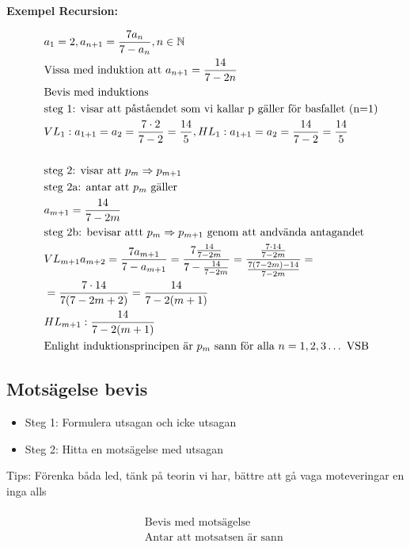 \textbf{Exempel Recursion:}\par
\begin{align*}
  &\quad  a_1 = 2, a_{n+1} = \frac{7a_n}{7-a_n}, n \in \mathbb{N} \\
  &\quad  \text{Vissa med induktion att } a_{n+1} = \frac{14}{7-2n} \\ 
  &\quad  \text{Bevis med induktions} \\
  &\quad  \text{steg 1: visar att påståendet som vi kallar p gäller för basfallet (n=1)} \\
  &\quad  VL_1: a_{1+1}=a_2=\frac{7 \cdot 2}{7-2}=\frac{14}{5}, HL_1: a_{1+1}=a_2=\frac{14}{7-2}=\frac{14}{5} \\
  &\quad  \\
  &\quad  \text{steg 2: visar att } p_m \Rightarrow p_{m+1} \\
  &\quad  \text{steg 2a: antar att } p_m \text{ gäller} \\
  &\quad  a_{m+1}=\frac{14}{7-2m}\\
  &\quad  \text{steg 2b: bevisar attt } p_m \Rightarrow p_{m+1} \text{ genom att andvända antagandet} \\
  &\quad  VL_{m+1}a_{m+2}=\frac{7a_{m+1}}{7-a_{m+1}} = \frac{7 \frac{14}{7-2m}}{7-\frac{14}{7-2m}} = \frac{\frac{7 \cdot14}{7-2m}}{\frac{7(7-2m) - 14}{7-2m}} = \\
  &\quad  = \frac{7 \cdot 14}{7(7-2m+2)} = \frac{14}{7-2(m+1)} \\
  &\quad  HL_{m+1}: \frac{14}{7-2(m+1)} \\
  &\quad  \text{Enlight induktionsprincipen är $ p_m $ sann för alla } n = 1,2,3 \ldots \text{ VSB}  \\
\end{align*}

\subsection{Motsägelse bevis}
\begin{itemize}
  \item Steg 1: Formulera utsagan och icke utsagan
  \item Steg 2: Hitta en motsägelse med utsagan
\end{itemize}
Tips: Förenka båda led, tänk på teorin vi har, bättre att gå vaga moteveringar en inga alls \newline

\begin{align*}
  &\quad  \\
  &\quad  \text{Bevis med motsägelse } \\
  &\quad  \text{Antar att motsatsen är sann  } \\
  &\quad  \\
\end{align*}



